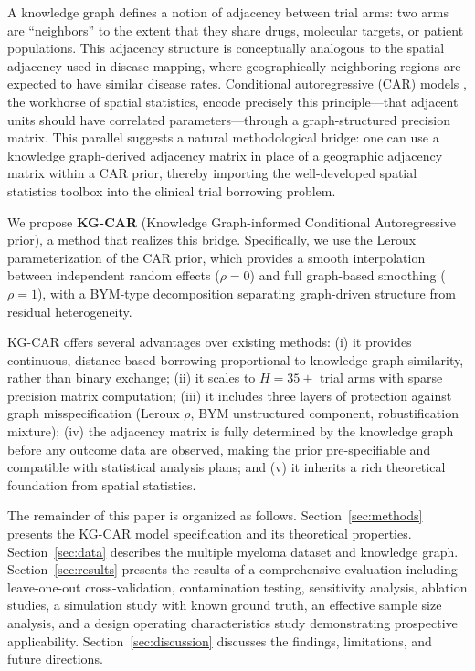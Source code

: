 \documentclass[12pt]{article}
\begin{document}
A knowledge graph defines a notion of adjacency between trial arms: two arms are ``neighbors'' to the extent that they share drugs, molecular targets, or patient populations. This adjacency structure is conceptually analogous to the spatial adjacency used in disease mapping, where geographically neighboring regions are expected to have similar disease rates. Conditional autoregressive (CAR) models \citep{besag1974spatial}, the workhorse of spatial statistics, encode precisely this principle---that adjacent units should have correlated parameters---through a graph-structured precision matrix. This parallel suggests a natural methodological bridge: one can use a knowledge graph-derived adjacency matrix in place of a geographic adjacency matrix within a CAR prior, thereby importing the well-developed spatial statistics toolbox into the clinical trial borrowing problem.

We propose \textbf{KG-CAR} (Knowledge Graph-informed Conditional Autoregressive prior), a method that realizes this bridge. Specifically, we use the Leroux parameterization \citep{leroux2000estimation} of the CAR prior, which provides a smooth interpolation between independent random effects ($\rho = 0$) and full graph-based smoothing ($\rho = 1$), with a BYM-type decomposition \citep{besag1991bayesian} separating graph-driven structure from residual heterogeneity.

KG-CAR offers several advantages over existing methods: (i) it provides continuous, distance-based borrowing proportional to knowledge graph similarity, rather than binary exchange; (ii) it scales to $H = 35+$ trial arms with sparse precision matrix computation; (iii) it includes three layers of protection against graph misspecification (Leroux $\rho$, BYM unstructured component, robustification mixture); (iv) the adjacency matrix is fully determined by the knowledge graph before any outcome data are observed, making the prior pre-specifiable and compatible with statistical analysis plans; and (v) it inherits a rich theoretical foundation from spatial statistics.

The remainder of this paper is organized as follows. Section~\ref{sec:methods} presents the KG-CAR model specification and its theoretical properties. Section~\ref{sec:data} describes the multiple myeloma dataset and knowledge graph. Section~\ref{sec:results} presents the results of a comprehensive evaluation including leave-one-out cross-validation, contamination testing, sensitivity analysis, ablation studies, a simulation study with known ground truth, an effective sample size analysis, and a design operating characteristics study demonstrating prospective applicability. Section~\ref{sec:discussion} discusses the findings, limitations, and future directions.
\end{document}

